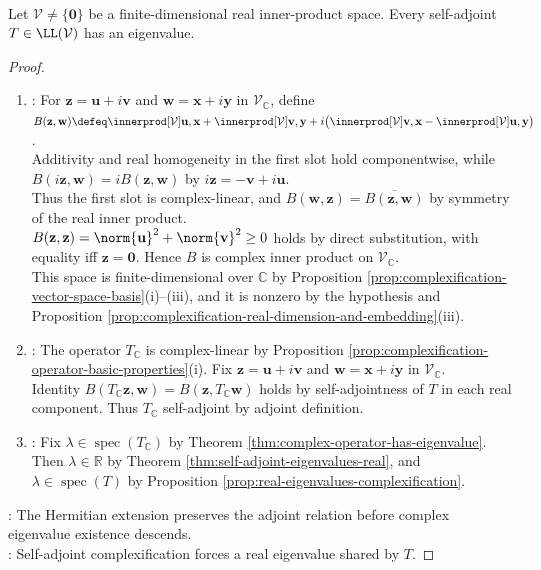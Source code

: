 \begin{lemma} \label{lem:self-adjoint-operators-have-eigenvalues} \\
Let $\mathcal{V}\neq\{\mathbf{0}\}$ be a finite-dimensional real inner-product space. Every self-adjoint $T\in\LL(\mathcal{V})$ has an eigenvalue.
\begin{proof}
\begin{enumerate}[label=(\roman*)]
\setlength{\itemsep}{0pt}
\item {}: For $\mathbf{z}=\mathbf{u}+i\mathbf{v}$ and $\mathbf{w}=\mathbf{x}+i\mathbf{y}$ in $\mathcal{V}_{\mathbb{C}}$, define $B(\mathbf{z},\mathbf{w})\defeq\innerprod[\mathcal{V}]{\mathbf{u},\mathbf{x}}+\innerprod[\mathcal{V}]{\mathbf{v},\mathbf{y}}+i\bigl(\innerprod[\mathcal{V}]{\mathbf{v},\mathbf{x}}-\innerprod[\mathcal{V}]{\mathbf{u},\mathbf{y}}\bigr)$.\\
Additivity and real homogeneity in the first slot hold componentwise, while $B(i\mathbf{z},\mathbf{w})=iB(\mathbf{z},\mathbf{w})$ by $i\mathbf{z}=-\mathbf{v}+i\mathbf{u}$.\\
Thus the first slot is complex-linear, and $B(\mathbf{w},\mathbf{z})=\overline{B(\mathbf{z},\mathbf{w})}$ by symmetry of the real inner product.\\
$B(\mathbf{z},\mathbf{z})=\norm{\mathbf{u}}^2+\norm{\mathbf{v}}^2\geq0$ holds by direct substitution, with equality iff $\mathbf{z}=\mathbf{0}$. Hence $B$ is complex inner product on $\mathcal{V}_{\mathbb{C}}$.\\
This space is finite-dimensional over $\mathbb{C}$ by Proposition \ref{prop:complexification-vector-space-basis}(i)--(iii), and it is nonzero by the hypothesis and Proposition \ref{prop:complexification-real-dimension-and-embedding}(iii).
\item {}: The operator $T_{\mathbb{C}}$ is complex-linear by Proposition \ref{prop:complexification-operator-basic-properties}(i). Fix $\mathbf{z}=\mathbf{u}+i\mathbf{v}$ and $\mathbf{w}=\mathbf{x}+i\mathbf{y}$ in $\mathcal{V}_{\mathbb{C}}$.\\
Identity $B(T_{\mathbb{C}}\mathbf{z},\mathbf{w})=B(\mathbf{z},T_{\mathbb{C}}\mathbf{w})$ holds by self-adjointness of $T$ in each real component. Thus $T_{\mathbb{C}}$ self-adjoint by adjoint definition.
\item {}: Fix $\lambda\in\operatorname{spec}(T_{\mathbb{C}})$ by Theorem \ref{thm:complex-operator-has-eigenvalue}. Then $\lambda\in\mathbb{R}$ by Theorem \ref{thm:self-adjoint-eigenvalues-real}, and $\lambda\in\operatorname{spec}(T)$ by Proposition \ref{prop:real-eigenvalues-complexification}.
\end{enumerate}
: The Hermitian extension preserves the adjoint relation before complex eigenvalue existence descends.\\
: Self-adjoint complexification forces a real eigenvalue shared by $T$.
\end{proof}
\end{lemma}

